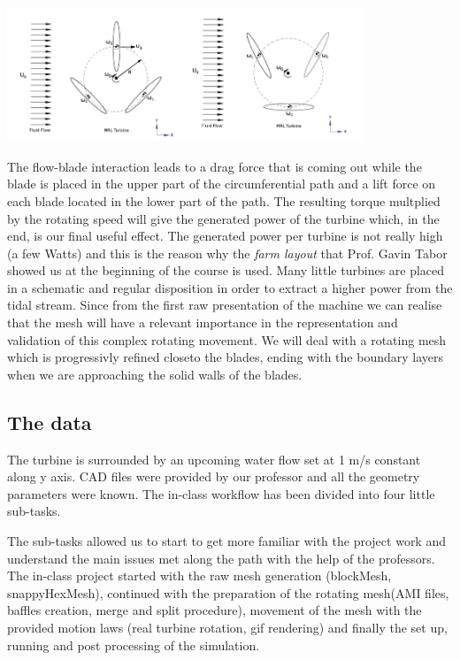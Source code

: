 \documentclass[a4paper,12pt]{article}
\begin{document}
\begin{center}
\includegraphics[width=0.8\textwidth]{images/flow.png} 
\end{center}

The flow-blade interaction leads to a drag force that is coming out while the blade is placed in the upper part of the circumferential path and a lift force on each blade located in the lower part of the path.
The resulting torque multplied by the rotating speed will give the generated power of the turbine which, in the end, is our final useful effect. The generated power per turbine is not really high (a few Watts) and this is the reason why the \emph{farm layout}  that Prof. Gavin Tabor showed us at the beginning of the course is used. Many little turbines are placed in a schematic and regular disposition in order to extract a higher power from the tidal stream.
Since from the first raw presentation of the machine we can realise that the mesh will have a relevant importance in the representation and validation of this complex rotating movement. We will deal with a rotating mesh which is progressivly refined closeto the blades, ending with the boundary layers when we are approaching the solid walls of the blades.


\subsection{The data}
The turbine is surrounded by an upcoming water flow set at 1 m/s constant along y axis. 
CAD files were provided by our professor and all the geometry parameters were known.
The in-class workflow has been divided into four little sub-tasks. 

The sub-tasks allowed us to start to get more familiar with the project work and understand the main issues met along the path with the help of the professors. The in-class project started with the raw mesh generation (blockMesh, snappyHexMesh), continued with the preparation of the rotating mesh(AMI files, baffles creation, merge and split procedure), movement of the mesh with the provided motion laws  (real turbine rotation, gif rendering) and finally the set up, running and post processing of the simulation.
\end{document}
